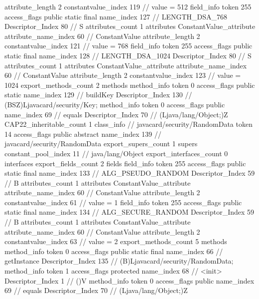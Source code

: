{{{{{{{					attribute_length	2
					constantvalue_index	119		// value = 512
				}
				}
			}
			field_info {
				token	255
				access_flags	public static final
				name_index	127		// LENGTH_DSA_768
				Descriptor_Index	80		// S
				attributes_count	1
				attributes {
				ConstantValue_attribute {
					attribute_name_index	60		// ConstantValue
					attribute_length	2
					constantvalue_index	121		// value = 768
				}
				}
			}
			field_info {
				token	255
				access_flags	public static final
				name_index	128		// LENGTH_DSA_1024
				Descriptor_Index	80		// S
				attributes_count	1
				attributes {
				ConstantValue_attribute {
					attribute_name_index	60		// ConstantValue
					attribute_length	2
					constantvalue_index	123		// value = 1024
				}
				}
			}
			}
			export_methods_count	2
			methods {
				method_info {
					token	0
					access_flags	public static
					name_index	129		// buildKey
					Descriptor_Index	130		// (BSZ)Ljavacard/security/Key;
				}
				method_info {
					token	0
					access_flags	public
					name_index	69		// equals
					Descriptor_Index	70		// (Ljava/lang/Object;)Z
				}
			}
			CAP22_inheritable_count	1
		}
		class_info {		// javacard/security/RandomData
			token	14
			access_flags	public abstract
			name_index	139		// javacard/security/RandomData
			export_supers_count	1
			supers {
				constant_pool_index	11		// java/lang/Object
			}
			export_interfaces_count	0
			interfaces {
			}
			export_fields_count	2
			fields {
			field_info {
				token	255
				access_flags	public static final
				name_index	133		// ALG_PSEUDO_RANDOM
				Descriptor_Index	59		// B
				attributes_count	1
				attributes {
				ConstantValue_attribute {
					attribute_name_index	60		// ConstantValue
					attribute_length	2
					constantvalue_index	61		// value = 1
				}
				}
			}
			field_info {
				token	255
				access_flags	public static final
				name_index	134		// ALG_SECURE_RANDOM
				Descriptor_Index	59		// B
				attributes_count	1
				attributes {
				ConstantValue_attribute {
					attribute_name_index	60		// ConstantValue
					attribute_length	2
					constantvalue_index	63		// value = 2
				}
				}
			}
			}
			export_methods_count	5
			methods {
				method_info {
					token	0
					access_flags	public static final
					name_index	66		// getInstance
					Descriptor_Index	135		// (B)Ljavacard/security/RandomData;
				}
				method_info {
					token	1
					access_flags	protected
					name_index	68		// <init>
					Descriptor_Index	1		// ()V
				}
				method_info {
					token	0
					access_flags	public
					name_index	69		// equals
					Descriptor_Index	70		// (Ljava/lang/Object;)Z
}}}}}
